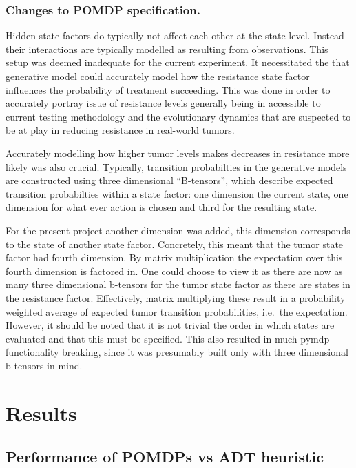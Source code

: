\documentclass[notspecified,article,submit,moreauthors,pdftex]{Definitions/mdpi}
\begin{document}
\subsubsection{Changes to POMDP
specification.}\label{changes-to-pomdp-specification.}

Hidden state factors do typically not affect each other at the state
level. Instead their interactions are typically modelled as resulting
from observations. This setup was deemed inadequate for the current
experiment. It necessitated the that generative model could accurately
model how the resistance state factor influences the probability of
treatment succeeding. This was done in order to accurately portray issue
of resistance levels generally being in accessible to current testing
methodology and the evolutionary dynamics that are suspected to be at
play in reducing resistance in real-world tumors.

Accurately modelling how higher tumor levels makes decreases in
resistance more likely was also crucial. Typically, transition
probabilties in the generative models are constructed using three
dimensional ``B-tensors'', which describe expected transition
probabilties within a state factor: one dimension the current state, one
dimension for what ever action is chosen and third for the resulting
state.

For the present project another dimension was added, this dimension
corresponds to the state of another state factor. Concretely, this meant
that the tumor state factor had fourth dimension. By matrix
multiplication the expectation over this fourth dimension is factored
in. One could choose to view it as there are now as many three
dimensional b-tensors for the tumor state factor as there are states in
the resistance factor. Effectively, matrix multiplying these result in a
probability weighted average of expected tumor transition probabilities,
i.e.~the expectation. However, it should be noted that it is not trivial
the order in which states are evaluated and that this must be specified.
This also resulted in much pymdp functionality breaking, since it was
presumably built only with three dimensional b-tensors in mind.

\section{Results}\label{results}

\subsection{Performance of POMDPs vs ADT
heuristic}\label{performance-of-pomdps-vs-adt-heuristic}
\end{document}
